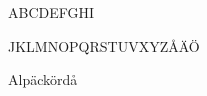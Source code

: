



\fontfam[ltccloister]\typosize[42/50]%

 ABCDEFGHI\par JKLMNOPQRSTUVXYZÅÄÖ

Alpäckördå


\vfil\break




